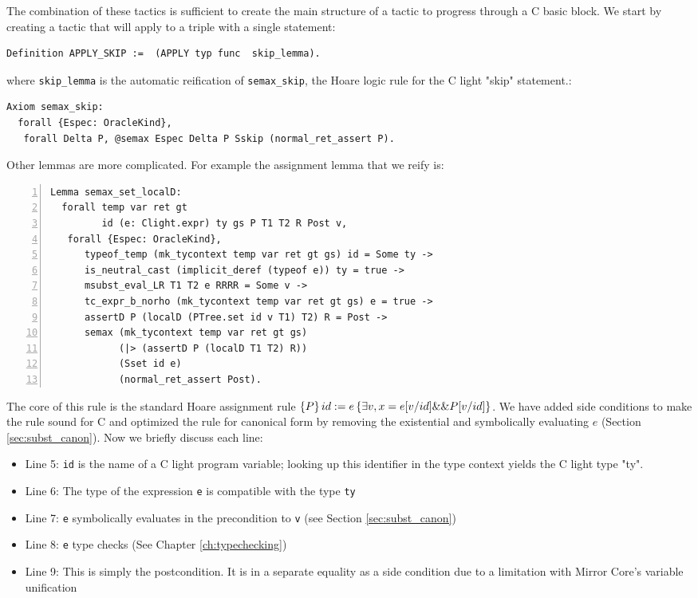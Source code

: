 \documentclass{puthesis}
\begin{document}
The combination of these tactics is sufficient to create the main
structure of a tactic to progress through a C basic block. We start by
creating a tactic that will apply to a triple with a single statement:

\begin{lstlisting}
Definition APPLY_SKIP :=  (APPLY typ func  skip_lemma).
\end{lstlisting}
where \lstinline|skip_lemma| is the automatic reification of
\lstinline|semax_skip|, the Hoare logic rule for the C light "skip" statement.:

\begin{lstlisting}
Axiom semax_skip:
  forall {Espec: OracleKind},
   forall Delta P, @semax Espec Delta P Sskip (normal_ret_assert P).
\end{lstlisting}

 Other lemmas are more
complicated. For example the assignment lemma that we reify is:
\pagebreak
\begin{lstlisting}[numbers=left]
Lemma semax_set_localD:
  forall temp var ret gt 
         id (e: Clight.expr) ty gs P T1 T2 R Post v,
   forall {Espec: OracleKind},
      typeof_temp (mk_tycontext temp var ret gt gs) id = Some ty -> 
      is_neutral_cast (implicit_deref (typeof e)) ty = true ->
      msubst_eval_LR T1 T2 e RRRR = Some v ->
      tc_expr_b_norho (mk_tycontext temp var ret gt gs) e = true ->
      assertD P (localD (PTree.set id v T1) T2) R = Post ->
      semax (mk_tycontext temp var ret gt gs) 
            (|> (assertD P (localD T1 T2) R))
            (Sset id e)
            (normal_ret_assert Post).
\end{lstlisting}

The core of this rule is the standard Hoare assignment rule
$\{P\}\,id:=e\,\{\exists v, x=e[v/id] \&\& P[v/id]\}$. We have added side
conditions to make the rule sound for C and optimized the rule for
canonical form by removing the existential and symbolically evaluating
$e$ (Section \ref{sec:subst_canon}). Now we briefly discuss each line:

\begin{itemize}
\item Line 5: \lstinline|id| is the name of a C light program
  variable; looking up this identifier in the type context yields the C light type "ty".
\item Line 6: The type of the expression \lstinline|e| is compatible
  with the type \lstinline|ty|
\item Line 7: \lstinline|e| symbolically evaluates in the precondition
  to \lstinline|v| (see Section \ref{sec:subst_canon})
\item Line 8: \lstinline|e| type checks (See Chapter
  \ref{ch:typechecking})
\item Line 9: This is simply the postcondition. It is in a separate
  equality as a side condition due to a limitation with Mirror Core's
  variable unification
\end{itemize}
\end{document}
